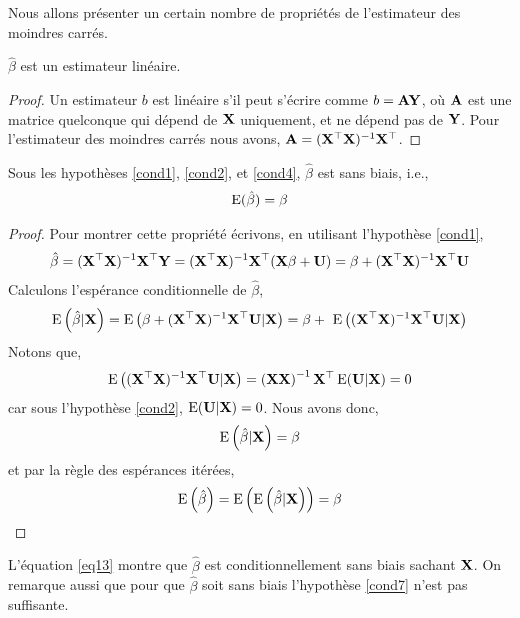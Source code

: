 Nous allons présenter un certain nombre de propriétés de l'estimateur des moindres carrés.
\begin{propriete}$\hat{\beta}$ est un estimateur linéaire.
\end{propriete}
\begin{proof}
Un estimateur $b$ est linéaire s'il peut s'écrire comme $b=\mathbf A\mathbf Y$, où $\mathbf A$ est une matrice quelconque qui dépend de $\mathbf X $ uniquement, et ne dépend pas de $\mathbf Y$. Pour l'estimateur des moindres carrés nous avons, $\mathbf A = (\mathbf X ^\top\mathbf X )^{-1}\mathbf X ^\top$.
\end{proof}
\begin{propriete}
Sous les hypothèses \eqref{cond1}, \eqref{cond2}, et \eqref{cond4}, $\hat{\beta}$ est sans biais, i.e.,
\begin{align*}
\operatorname{E}(\hat{\beta}) = \beta
\end{align*}
\end{propriete}
\begin{proof}
Pour montrer cette propriété écrivons, en utilisant l'hypothèse \eqref{cond1},
\begin{align*}
\hat{\beta} = (\mathbf X ^\top\mathbf X )^{-1}\mathbf X ^\top\mathbf Y =  (\mathbf X ^\top\mathbf X )^{-1}\mathbf X ^\top (\mathbf X \beta + \mathbf U) = 
\beta + (\mathbf X ^\top\mathbf X )^{-1}\mathbf X ^\top\mathbf U
\end{align*}
Calculons l'espérance conditionnelle de $\hat{\beta}$,
\begin{align*}
\Exp\left(\hat{\beta} | \boldX \right) = \Exp\left(\beta + (\boldX ^\top\boldX )^{-1}\boldX ^\top\boldU | \boldX \right) = \beta +\ \Exp\left((\boldX ^\top\boldX )^{-1}\boldX ^\top\boldU | \boldX \right)
\end{align*}
Notons que,
\begin{align*}
\operatorname{E}\left((\mathbf X ^\top\mathbf X )^{-1}\mathbf X ^\top\mathbf U | \mathbf X \right) = 
\left(\mathbf X \mathbf X \right)^{-1}\mathbf X ^\top\operatorname{E}(\mathbf U|\mathbf X ) = 0
\end{align*} 
car sous l'hypothèse \eqref{cond2}, $\operatorname{E}(\mathbf U|\mathbf X ) = 0$. Nous avons donc,
\begin{align}
\operatorname{E}\left(\hat{\beta} | \mathbf X \right) = \beta
\label{eq13}
\end{align}
et par la règle des espérances itérées,
\begin{align*}
\operatorname{E}\left(\hat{\beta}\right) = \operatorname{E}\left(\operatorname{E}\left(\hat{\beta} | \mathbf X \right)\right)=\beta
\end{align*}
\end{proof}
L'équation \eqref{eq13} montre que $\hat{\beta}$ est conditionnellement sans biais sachant $\mathbf X $. On remarque aussi que pour que $\hat{\beta}$ soit sans biais l'hypothèse \eqref{cond7} n'est pas suffisante.

